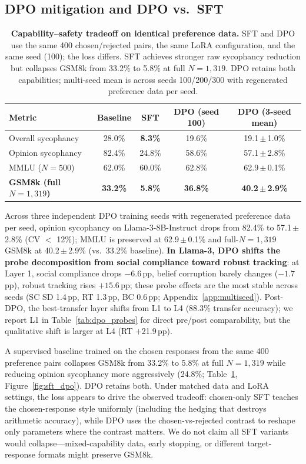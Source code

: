 \documentclass{article}
\begin{document}
\subsection{DPO mitigation and DPO vs.\ SFT}
\label{sec:dpo}

\begin{table}[t]
\centering
\caption{\textbf{Capability--safety tradeoff on identical preference data.} SFT and DPO use the same 400 chosen/rejected pairs, the same LoRA configuration, and the same seed (100); the loss differs. SFT achieves stronger raw sycophancy reduction but collapses GSM8k from 33.2\% to 5.8\% at full $N{=}1{,}319$. DPO retains both capabilities; multi-seed mean is across seeds 100/200/300 with regenerated preference data per seed.}
\label{tab:sft_dpo}
\small
\begin{tabular}{@{}lcccc@{}}
\toprule
\textbf{Metric} & \textbf{Baseline} & \textbf{SFT} & \textbf{DPO (seed 100)} & \textbf{DPO (3-seed mean)} \\
\midrule
Overall sycophancy & 28.0\% & \textbf{8.3\%} & 19.6\% & 19.1\,$\pm$\,1.0\% \\
Opinion sycophancy & 82.4\% & 24.8\% & 58.6\% & 57.1\,$\pm$\,2.8\% \\
MMLU ($N{=}500$) & 62.0\% & 60.0\% & 62.8\% & 62.9\,$\pm$\,0.1\% \\
\textbf{GSM8k (full $N{=}1{,}319$)} & \textbf{33.2\%} & \textbf{5.8\%} & \textbf{36.8\%} & \textbf{40.2\,$\pm$\,2.9\%} \\
\bottomrule
\end{tabular}
\end{table}

Across three independent DPO training seeds with regenerated preference data per seed, opinion sycophancy on Llama-3-8B-Instruct drops from 82.4\% to 57.1\,$\pm$\,2.8\% (CV $<$ 12\%); MMLU is preserved at 62.9\,$\pm$\,0.1\% and full-$N{=}1{,}319$ GSM8k at 40.2\,$\pm$\,2.9\% (vs.\ 33.2\% baseline). \textbf{In Llama-3, DPO shifts the probe decomposition from social compliance toward robust tracking}: at Layer 1, social compliance drops $-6.6$\,pp, belief corruption barely changes ($-1.7$\,pp), robust tracking rises $+15.6$\,pp; these probe effects are the most stable across seeds (SC SD 1.4\,pp, RT 1.3\,pp, BC 0.6\,pp; Appendix~\ref{app:multiseed}). Post-DPO, the best-transfer layer shifts from L1 to L4 (88.3\% transfer accuracy); we report L1 in Table~\ref{tab:dpo_probes} for direct pre/post comparability, but the qualitative shift is larger at L4 (RT $+$21.9\,pp).

A supervised baseline trained on the chosen responses from the same 400 preference pairs collapses GSM8k from 33.2\% to 5.8\% at full $N{=}1{,}319$ while reducing opinion sycophancy more aggressively (24.8\%; Table~\ref{tab:sft_dpo}, Figure~\ref{fig:sft_dpo}). DPO retains both. Under matched data and LoRA settings, the loss appears to drive the observed tradeoff: chosen-only SFT teaches the chosen-response style uniformly (including the hedging that destroys arithmetic accuracy), while DPO uses the chosen-vs-rejected contrast to reshape only parameters where the contrast matters. We do not claim all SFT variants would collapse---mixed-capability data, early stopping, or different target-response formats might preserve GSM8k.
\end{document}
